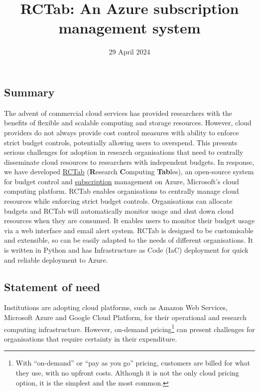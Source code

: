 \documentclass{article}
\title{RCTab: An Azure subscription management system}
\author{}
\date{29 April 2024}
\begin{document}
\maketitle

\subsection{Summary}\label{summary}

The advent of commercial cloud services has provided researchers with
the benefits of flexible and scalable computing and storage resources.
However, cloud providers do not always provide cost control measures
with ability to enforce strict budget controls, potentially allowing
users to overspend. This presents serious challenges for adoption in
research organisations that need to centrally disseminate cloud
resources to researchers with independent budgets. In response, we have
developed \href{https://rctab.readthedocs.io/}{RCTab} (\textbf{R}esearch
\textbf{C}omputing \textbf{Tab}les), an open-source system for budget
control and
\href{https://learn.microsoft.com/en-us/azure/cloud-adoption-framework/ready/azure-setup-guide/organize-resources\#management-levels-and-hierarchy}{subscription}
management on Azure, Microsoft's cloud computing platform. RCTab enables
organisations to centrally manage cloud resources while enforcing strict
budget controls. Organisations can allocate budgets and RCTab will
automatically monitor usage and shut down cloud resources when they are
consumed. It enables users to monitor their budget usage via a web
interface and email alert system. RCTab is designed to be customisable
and extensible, so can be easily adapted to the needs of different
organisations. It is written in Python and has Infrastructure as Code
(IaC) deployment for quick and reliable deployment to Azure.

\subsection{Statement of need}\label{statement-of-need}

Institutions are adopting cloud platforms, such as Amazon Web Services,
Microsoft Azure and Google Cloud Platform, for their operational and
research computing infrastructure. However, on-demand
pricing\footnote{With ``on-demand'' or ``pay as you go'' pricing,
  customers are billed for what they use, with no upfront costs.
  Although it is not the only cloud pricing option, it is the simplest
  and the most common.} can present challenges for organisations that
require certainty in their expenditure.
\end{document}
